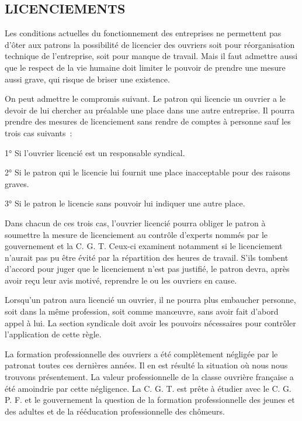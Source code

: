 \documentclass[french,twoside]{book} %
\begin{document}
\subsection[LICENCIEMENTS]{LICENCIEMENTS}
\noindent Les conditions actuelles du fonctionnement des entreprises ne permettent pas d'ôter aux patrons la possibilité de licencier des ouvriers soit pour réorganisation technique de l'entreprise, soit pour manque de travail. Mais il faut admettre aussi que le respect de la vie humaine doit limiter le pouvoir de prendre une mesure aussi grave, qui risque de briser une existence.\par
On peut admettre le compromis suivant. Le patron qui licencie un ouvrier a le devoir de lui chercher au préalable une place dans une autre entreprise. Il pourra prendre des mesures de licenciement sans rendre de comptes à personne sauf les trois cas suivants :\par
1° Si l'ouvrier licencié est un responsable syndical.\par
2° Si le patron qui le licencie lui fournit une place inacceptable pour des raisons graves.\par
3° Si le patron le licencie sans pouvoir lui indiquer une autre place.\par
Dans chacun de ces trois cas, l'ouvrier licencié pourra obliger le patron à soumettre la mesure de licenciement au contrôle d'experts nommés par le gouvernement et la C. G. T. Ceux-ci examinent notamment si le licenciement n'aurait pas pu être évité par la répartition des heures de travail. S'ils tombent d'accord pour juger que le licenciement n'est pas justifié, le patron devra, après avoir reçu leur avis motivé, reprendre le ou les ouvriers en cause.\par
Lorsqu'un patron aura licencié un ouvrier, il ne pourra plus embaucher personne, soit dans la même profession, soit comme manœuvre, sans avoir fait d'abord appel à lui. La section syndicale doit avoir les pouvoirs nécessaires pour contrôler l'application de cette règle.\par
La formation professionnelle des ouvriers a été complètement négligée par le patronat toutes ces dernières années. Il en est résulté la situation où nous nous trouvons présentement. La valeur professionnelle de la classe ouvrière française a été amoindrie par cette négligence. La C. G. T. est prête à étudier avec le C. G. P. F. et le gouvernement la question de la formation professionnelle des jeunes et des adultes et de la rééducation professionnelle des chômeurs.
\end{document}
